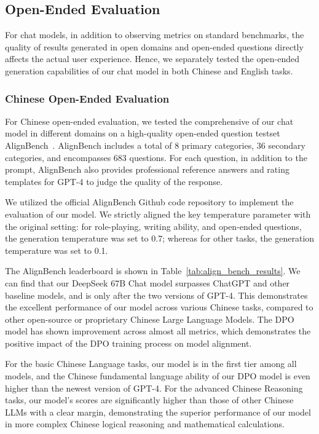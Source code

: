 \subsection{Open-Ended Evaluation} For chat models, in addition to observing metrics on standard benchmarks, the quality of results generated in open domains and open-ended questions directly affects the actual user experience. Hence, we separately tested the open-ended generation capabilities of our chat model in both Chinese and English tasks.

\subsubsection{Chinese Open-Ended Evaluation} For Chinese open-ended evaluation, we tested the comprehensive of our chat model in different domains on a high-quality open-ended question testset AlignBench~\citep{align_bench}. AlignBench includes a total of 8 primary categories,  36 secondary categories, and encompasses 683 questions. For each question, in addition to the prompt, AlignBench also provides professional reference answers and rating templates for GPT-4 to judge the quality of the response.

We utilized the official AlignBench Github code repository to implement the evaluation of our model. We strictly aligned the key temperature parameter with the original setting: for role-playing, writing ability, and open-ended questions, the generation temperature was set to 0.7; whereas for other tasks, the generation temperature was set to 0.1.

The AlignBench leaderboard is shown in Table~\ref{tab:align_bench_results}. We can find that our DeepSeek 67B Chat model surpasses ChatGPT and other baseline models, and is only after the two versions of GPT-4. This demonstrates the excellent performance of our model across various Chinese tasks, compared to other open-source or proprietary Chinese Large Language Models. The DPO model has shown improvement across almost all metrics, which demonstrates the positive impact of the DPO training process on model alignment.

For the basic Chinese Language tasks, our model is in the first tier among all models, and the Chinese fundamental language ability of our DPO model is even higher than the newest version of GPT-4. For the advanced Chinese Reasoning tasks, our model's scores are significantly higher than those of other Chinese LLMs with a clear margin, demonstrating the superior performance of our model in more complex Chinese logical reasoning and mathematical calculations.

